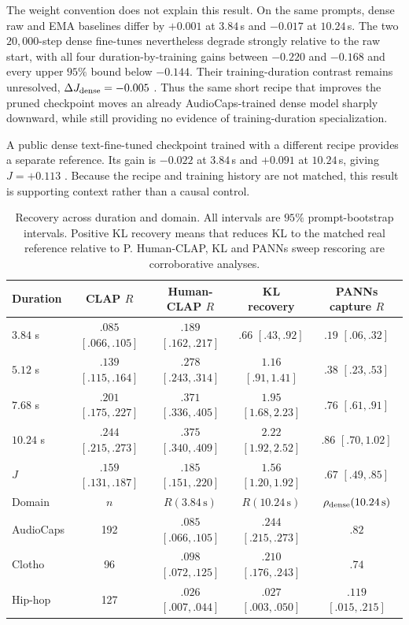 The weight convention does not explain this result. On the same prompts, dense raw and EMA baselines differ by $+0.001$  at $3.84$\,s and $-0.017$  at $10.24$\,s. The two $20{,}000$-step dense fine-tunes nevertheless degrade strongly relative to the raw start, with all four duration-by-training gains between $-0.220$ and $-0.168$ and every upper $95\%$ bound below $-0.144$. Their training-duration contrast remains unresolved, $\Delta J_{\rm dense}=-0.005$ . Thus the same short recipe that improves the pruned checkpoint moves an already AudioCaps-trained dense model sharply downward, while still providing no evidence of training-duration specialization.

A public dense text-fine-tuned checkpoint trained with a different recipe provides a separate reference. Its gain is $-0.022$  at $3.84$\,s and $+0.091$  at $10.24$\,s, giving $J=+0.113$ . Because the recipe and training history are not matched, this result is supporting context rather than a causal control.

\begin{table}[t]
\centering
\caption{Recovery across duration and domain. All intervals are $95\%$ prompt-bootstrap intervals. Positive KL recovery means that \PFT{} reduces KL to the matched real reference relative to P. Human-CLAP, KL and PANNs sweep rescoring are corroborative analyses.}
\label{tab:evidence}
\setlength{\tabcolsep}{4.0pt}
\begin{tabular}{@{}lcccc@{}}
\toprule
Duration & CLAP $R$ & Human-CLAP $R$ & KL recovery & PANNs capture $R$ \\
\midrule
$3.84$ s & $.085$ $[.066,.105]$ & $.189$ $[.162,.217]$ & $.66$ $[.43,.92]$ & $.19$ $[.06,.32]$ \\
$5.12$ s & $.139$ $[.115,.164]$ & $.278$ $[.243,.314]$ & $1.16$ $[.91,1.41]$ & $.38$ $[.23,.53]$ \\
$7.68$ s & $.201$ $[.175,.227]$ & $.371$ $[.336,.405]$ & $1.95$ $[1.68,2.23]$ & $.76$ $[.61,.91]$ \\
$10.24$ s & $.244$ $[.215,.273]$ & $.375$ $[.340,.409]$ & $2.22$ $[1.92,2.52]$ & $.86$ $[.70,1.02]$ \\
$J$ & $.159$ $[.131,.187]$ & $.185$ $[.151,.220]$ & $1.56$ $[1.20,1.92]$ & $.67$ $[.49,.85]$ \\
\midrule
Domain & $n$ & $R(3.84\,\mathrm{s})$ & $R(10.24\,\mathrm{s})$ & $\rho_{\rm dense}(10.24\,\mathrm{s})$ \\
\midrule
AudioCaps & 192 & $.085$ $[.066,.105]$ & $.244$ $[.215,.273]$ & $.82$ \\
Clotho & 96 & $.098$ $[.072,.125]$ & $.210$ $[.176,.243]$ & $.74$ \\
Hip-hop & 127 & $.026$ $[.007,.044]$ & $.027$ $[.003,.050]$ & $.119$ $[.015,.215]$ \\
\bottomrule
\end{tabular}
\end{table}

